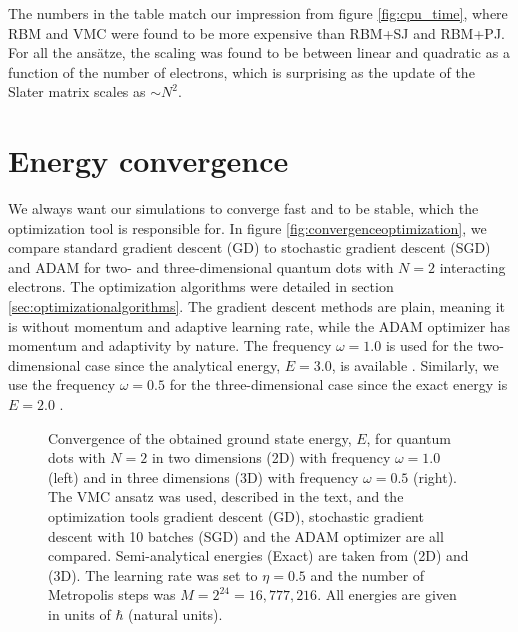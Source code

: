 The numbers in the table match our impression from figure \eqref{fig:cpu_time}, where RBM and VMC were found to be more expensive than RBM+SJ and RBM+PJ. For all the ansätze, the scaling was found to be between linear and quadratic as a function of the number of electrons, which is surprising as the update of the Slater matrix scales as $\sim N^2$. 

\section{Energy convergence}
We always want our simulations to converge fast and to be stable, which the optimization tool is responsible for. In figure \eqref{fig:convergenceoptimization}, we compare standard gradient descent (GD) to stochastic gradient descent (SGD) and ADAM for two- and three-dimensional quantum dots with $N=2$ interacting electrons. The optimization algorithms were detailed in section \ref{sec:optimizationalgorithms}. The gradient descent methods are plain, meaning it is without momentum and adaptive learning rate, while the ADAM optimizer has momentum and adaptivity by nature. The frequency $\omega=1.0$ is used for the two-dimensional case since the analytical energy, $E=3.0$, is available \supercite{taut_two_1993}. Similarly, we use the frequency $\omega=0.5$ for the three-dimensional case since the exact energy is $E=2.0$ \supercite{taut_two_1994}. 

\begin{figure}
	\centering 
	\subfloat{{}}
	\caption{Convergence of the obtained ground state energy, $E$, for quantum dots with $N=2$ in two dimensions (2D) with frequency $\omega=1.0$ (left) and in three dimensions (3D) with frequency $\omega=0.5$ (right). The VMC ansatz was used, described in the text, and the optimization tools gradient descent (GD), stochastic gradient descent with 10 batches (SGD) and the ADAM optimizer are all compared. Semi-analytical energies (Exact) are taken from \citet{taut_two_1993} (2D) and \citet{taut_two_1994} (3D). The learning rate was set to $\eta=0.5$ and the number of Metropolis steps was $M=2^{24}=16,777,216$. All energies are given in units of $\hbar$ (natural units).}
	\label{fig:convergenceoptimization}
\end{figure} 

